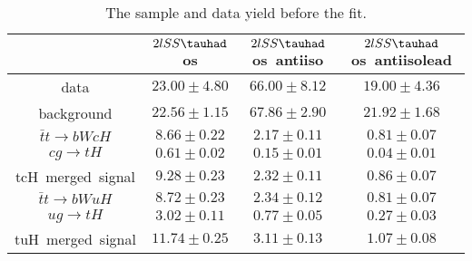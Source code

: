 \begin{table}
\footnotesize
\caption{The sample and data yield before the fit.}
\centering
\begin{tabular}{|c|c|c|c|} \hline
 & $2lSS\tauhad$ os & $2lSS\tauhad$ os~antiiso & $2lSS\tauhad$ os~antiisolead\\\hline
data & $23.00\pm4.80$ & $66.00\pm8.12$ & $19.00\pm4.36$\\\hline
background & $22.56\pm1.15$ & $67.86\pm2.90$ & $21.92\pm1.68$\\\hline
$\bar{t}t\to bWcH$ & $8.66\pm0.22$ & $2.17\pm0.11$ & $0.81\pm0.07$\\\hline
$cg\to tH$ & $0.61\pm0.02$ & $0.15\pm0.01$ & $0.04\pm0.01$\\\hline
tcH~merged~signal & $9.28\pm0.23$ & $2.32\pm0.11$ & $0.86\pm0.07$\\\hline
$\bar{t}t\to bWuH$ & $8.72\pm0.23$ & $2.34\pm0.12$ & $0.81\pm0.07$\\\hline
$ug\to tH$ & $3.02\pm0.11$ & $0.77\pm0.05$ & $0.27\pm0.03$\\\hline
tuH~merged~signal & $11.74\pm0.25$ & $3.11\pm0.13$ & $1.07\pm0.08$\\\hline
\end{tabular}
\label{tab:yield}
\end{table}
